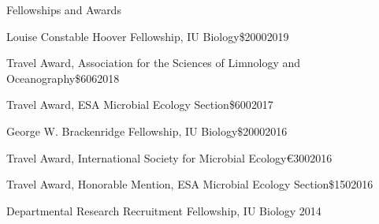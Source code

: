 \documentclass{resume} %
\begin{document}
\begin{rSection}{Fellowships and Awards}

\begin{Award}{Louise Constable Hoover Fellowship, IU Biology}{\$2000}{2019}
\end{Award}

\begin{Award}{Travel Award, Association for the Sciences of Limnology and Oceanography}{\$606}{2018}
\end{Award}

\begin{Award}{Travel Award, ESA Microbial Ecology Section}{\$600}{2017}
\end{Award}

\begin{Award}{George W. Brackenridge Fellowship, IU Biology}{\$2000}{2016}
\end{Award}

\begin{Award}{Travel Award, International Society for Microbial Ecology}{\euro{}300}{2016}
\end{Award}

\begin{Award}{Travel Award, Honorable Mention, ESA Microbial Ecology Section}{\$150}{2016}
\end{Award}

\begin{Award}{Departmental Research Recruitment Fellowship, IU Biology}{ }{2014}
\end{Award}

\end{rSection}
\end{document}
